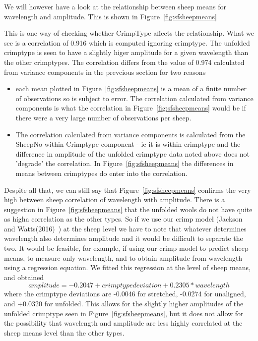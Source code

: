 \documentclass[titlepage,10pt]{article}  %
\begin{document}
We will however have a look at the relationship between sheep means for wavelength and amplitude. This is shown in Figure~\ref{fig:sfsheepmeans}

This is one way of checking whether CrimpType affects the relationship. What we see is a correlation of 0.916 which is computed ignoring crimptype. The unfolded crimptype is seen to have a slightly higer amplitude for a given wavelength than the other crimptypes. The correlation differs from the value of 0.974 calculated from variance components in the prevcious section for two reasons
\begin{itemize}
\item each mean plotted in Figure~\ref{fig:sfsheepmeans} is a mean of a finite number of observations so is subject to error. The correlation calculated from variance components is what the correlation in Figure~\ref{fig:sfsheepmeans} would be if there were a very large number of observations per sheep.
\item The correlation calculated from variance components is calculated from the SheepNo within Crimptype component - ie it is within crimptype and the difference in amplitude of the unfolded crimptype data noted above does not 'degrade' the correlation. In Figure~\ref{fig:sfsheepmeans} the differences in means between crimptypes do enter into the correlation.
\end{itemize}
Despite all that, we can still say that Figure~\ref{fig:sfsheepmeans} confirms the very high between sheep correlation of wavelength with amplitude. There is a suggestion in Figure~\ref{fig:sfsheepmeans} that the unfolded wools do not have quite as higha correlation as the other types. So if we use our crimp model (Jackson and Watts(2016)~\cite{jack:16}) at the sheep level we have to note that whatever determines wavelength also determines amplitude and it would be difficult to separate the two. It would be feasible, for example, if using our crimp model to predict sheep means, to measure only wavelength, and to obtain amplitude from wavelength using a regression equation. We fitted this regression at the level of sheep means, and obtained
\begin{displaymath}
amplitude = -0.2047  + crimptype deviation + 0.2305 * wavelength
\end{displaymath}
where the crimptype deviations are -0.0046 for stretched, -0.0274 for unaligned, and +0.0320 for unfolded. 
This allows for the slightly higher amplitudes of the unfolded crimptype seen in Figure~\ref{fig:sfsheepmeans}, but it does not allow for the possibility that wavelength and amplitude are less highly correlated at the sheep means level than the other types.
\end{document}
